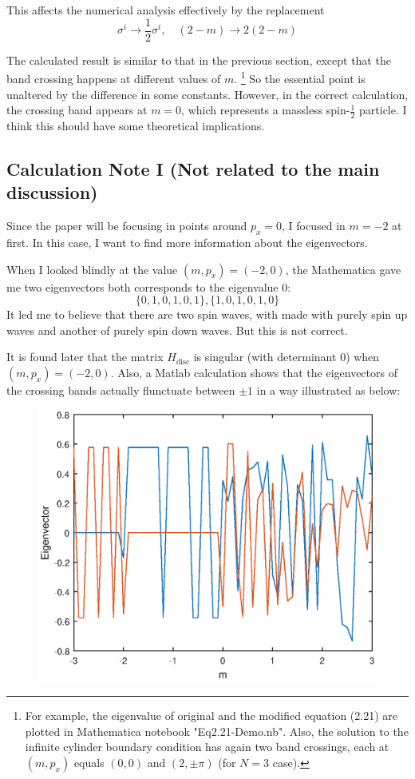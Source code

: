 \documentclass{article}
\begin{document}
    This affects the numerical analysis effectively by the replacement
    $$\sigma^i \to \frac{1}{2}\sigma^i,\quad
        (2-m) \to 2(2-m) $$

    The calculated result is similar to that in the previous section,
    except that the band crossing happens at different values of $m$.
    \footnote{For example, the eigenvalue of original and the modified equation
    (2.21) are plotted in Mathematica notebook "Eq2.21-Demo.nb". Also,
    the solution to the infinite cylinder boundary condition has again
    two band crossings, each at $(m,p_x)$ equals $(0,0)$ and
    $(2,\pm\pi)$ (for $N=3$ case).}
    So the essential point is unaltered by the difference in some
    constants. However, in the correct calculation, the crossing band
    appears at $m=0$, which represents a massless spin-$\frac{1}{2}$
    particle. I think this should have some theoretical implications.

    \subsection{Calculation Note I (Not related to the main discussion)}

Since the paper will be focusing in points around $p_x=0$, I focused
in $m=-2$ at first. In this case, I want to find more information
about the eigenvectors. 

When I looked blindly at the value $(m,p_x)=(-2,0)$, the
Mathematica gave me two eigenvectors both corresponds to the
eigenvalue $0$:
\begin{equation}
    \{0,1,0,1,0,1\},\{1,0,1,0,1,0\}
\end{equation}
It led me to believe that there are two spin waves, with made with
purely spin up waves and another of purely spin down waves. But
this is not correct. 

It is found later that the matrix $H_\text{disc}$ is singular
(with determinant $0$) when $(m,p_x)=(-2,0)$. Also, a Matlab
calculation shows that the eigenvectors of the crossing bands
actually flunctuate between $\pm 1$ in a way illustrated as below:
\begin{figure}[H]
    \centering
    \includegraphics[width=0.6\linewidth]{pics/Eigenvector-m.eps}
\end{figure}
\end{document}
